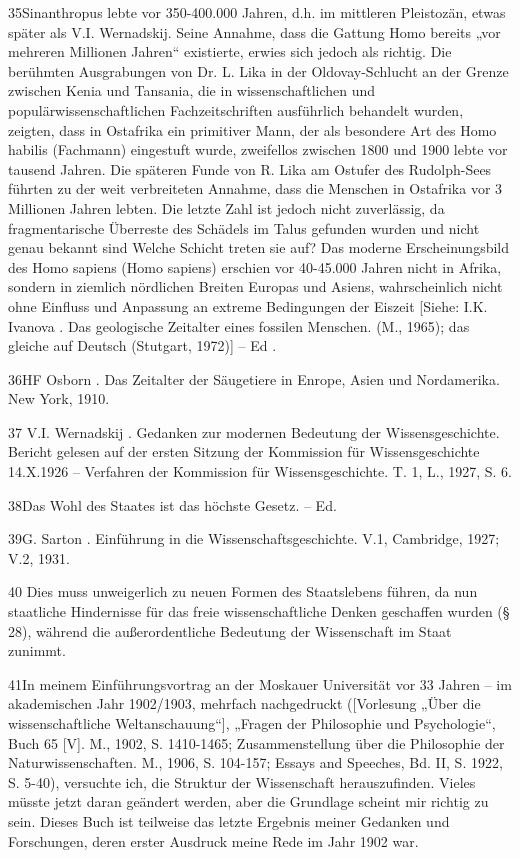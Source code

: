 \documentclass[11pt,a4paper]{book}
\begin{document}
35Sinanthropus lebte vor 350-400.000 Jahren, d.h. im mittleren Pleistozän, etwas später als V.I. Wernadskij. Seine Annahme, dass die Gattung Homo bereits „vor mehreren Millionen Jahren“ existierte, erwies sich jedoch als richtig. Die berühmten Ausgrabungen von Dr. L. Lika in der Oldovay-Schlucht an der Grenze zwischen Kenia und Tansania, die in wissenschaftlichen und populärwissenschaftlichen Fachzeitschriften ausführlich behandelt wurden, zeigten, dass in Ostafrika ein primitiver Mann, der als besondere Art des Homo habilis (Fachmann) eingestuft wurde, zweifellos zwischen 1800 und 1900 lebte vor tausend Jahren. Die späteren Funde von R. Lika am Ostufer des Rudolph-Sees führten zu der weit verbreiteten Annahme, dass die Menschen in Ostafrika vor 3 Millionen Jahren lebten. Die letzte Zahl ist jedoch nicht zuverlässig, da fragmentarische Überreste des Schädels im Talus gefunden wurden und nicht genau bekannt sind Welche Schicht treten sie auf? Das moderne Erscheinungsbild des Homo sapiens (Homo sapiens) erschien vor 40-45.000 Jahren nicht in Afrika, sondern in ziemlich nördlichen Breiten Europas und Asiens, wahrscheinlich nicht ohne Einfluss und Anpassung an extreme Bedingungen der Eiszeit [Siehe: I.K. Ivanova . Das geologische Zeitalter eines fossilen Menschen. (M., 1965); das gleiche auf Deutsch (Stutgart, 1972)] -- Ed .



36HF Osborn . Das Zeitalter der Säugetiere in Enrope, Asien und Nordamerika. New York, 1910.



37 V.I. Wernadskij . Gedanken zur modernen Bedeutung der Wissensgeschichte. Bericht gelesen auf der ersten Sitzung der Kommission für Wissensgeschichte 14.X.1926 -- Verfahren der Kommission für Wissensgeschichte. T. 1, L., 1927, S. 6.



38Das Wohl des Staates ist das höchste Gesetz. -- Ed.



39G. Sarton . Einführung in die Wissenschaftsgeschichte. V.1, Cambridge, 1927; V.2, 1931.



40 Dies muss unweigerlich zu neuen Formen des Staatslebens führen, da nun staatliche Hindernisse für das freie wissenschaftliche Denken geschaffen wurden (§ 28), während die außerordentliche Bedeutung der Wissenschaft im Staat zunimmt.



41In meinem Einführungsvortrag an der Moskauer Universität vor 33 Jahren -- im akademischen Jahr 1902/1903, mehrfach nachgedruckt ([Vorlesung „Über die wissenschaftliche Weltanschauung“], „Fragen der Philosophie und Psychologie“, Buch 65 [V]. M., 1902, S. 1410-1465; Zusammenstellung über die Philosophie der Naturwissenschaften. M., 1906, S. 104-157; Essays and Speeches, Bd. II, S. 1922, S. 5-40), versuchte ich, die Struktur der Wissenschaft herauszufinden. Vieles müsste jetzt daran geändert werden, aber die Grundlage scheint mir richtig zu sein. Dieses Buch ist teilweise das letzte Ergebnis meiner Gedanken und Forschungen, deren erster Ausdruck meine Rede im Jahr 1902 war.
\end{document}
